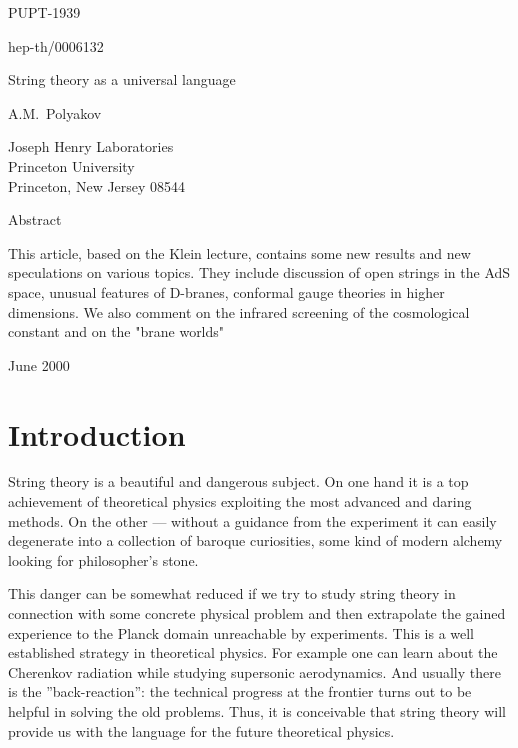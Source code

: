 \documentclass[a4paper,12pt]{article}
\begin{document}
\begin{titlepage}
\begin{flushright}
PUPT-1939

hep-th/0006132
\end{flushright}

\vspace{7 mm}

\begin{center}
{\huge String theory as a universal language}
\end{center}
\vspace{10 mm}
\begin{center}
{\large  

A.M.~Polyakov\\
}
\vspace{3mm}
Joseph Henry Laboratories\\
Princeton University\\
Princeton, New Jersey 08544
\end{center}
\vspace{7mm}
\begin{center}
{\large Abstract}
\end{center}
\noindent This article, based on the Klein lecture, contains some new results and new speculations on various topics. They include discussion of  open strings in the AdS space, unusual features of D-branes,
conformal gauge theories in higher dimensions. We also comment on the infrared screening of the  cosmological constant
and on the "brane worlds"
\vspace{7mm}
\begin{flushleft}
June 2000

\end{flushleft}
\end{titlepage}


\section{\protect\bigskip Introduction}

String theory is a beautiful and dangerous subject. On one hand it is a top
achievement of theoretical physics exploiting the most advanced and daring
methods. On the other --- without a guidance from the experiment it can easily
degenerate into a collection of baroque curiosities, some kind of modern
alchemy looking for philosopher's stone.

This danger can be somewhat reduced if we try to study string theory in
connection with some concrete physical problem and then extrapolate the
gained experience to the Planck domain unreachable by experiments. This is a
well established strategy in theoretical physics. For example one can learn
about the Cherenkov radiation while studying supersonic aerodynamics. And
usually there is the ''back-reaction'': the technical progress at the
frontier turns out to be helpful in solving the old problems. Thus, it is
conceivable that string theory will provide us with the language for the
future theoretical physics.
\end{document}
